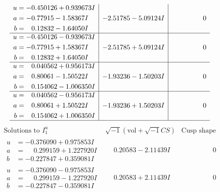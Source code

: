 \documentclass[1p]{elsarticle_modified}
\theoremstyle{definition}
\newcommand{\I}{\sqrt{-1}}
\begin{document}
$$\begin{array}{c|c|c}
\begin{aligned}
u &= -0.450126 + 0.939673 I \\
a &= -0.77915 - 1.58367 I \\
b &= \phantom{-}0.12832 - 1.64050 I\end{aligned}
 & -2.51785 - 5.09124 I & \phantom{-0.000000 } 0 \\ \hline\begin{aligned}
u &= -0.450126 - 0.939673 I \\
a &= -0.77915 + 1.58367 I \\
b &= \phantom{-}0.12832 + 1.64050 I\end{aligned}
 & -2.51785 + 5.09124 I & \phantom{-0.000000 } 0 \\ \hline\begin{aligned}
u &= \phantom{-}0.040562 + 0.956173 I \\
a &= \phantom{-}0.80061 - 1.50522 I \\
b &= \phantom{-}0.154062 - 1.006350 I\end{aligned}
 & -1.93236 - 1.50203 I & \phantom{-0.000000 } 0 \\ \hline\begin{aligned}
u &= \phantom{-}0.040562 - 0.956173 I \\
a &= \phantom{-}0.80061 + 1.50522 I \\
b &= \phantom{-}0.154062 + 1.006350 I\end{aligned}
 & -1.93236 + 1.50203 I & \phantom{-0.000000 } 0\\
 \hline 
 \end{array}$$\newpage$$\begin{array}{c|c|c}  
\text{Solutions to }I^u_{1}& \I (\text{vol} + \sqrt{-1}CS) & \text{Cusp shape}\\
 \hline 
\begin{aligned}
u &= -0.376090 + 0.975853 I \\
a &= \phantom{-}0.299159 + 1.227920 I \\
b &= -0.227847 + 0.359081 I\end{aligned}
 & \phantom{-}0.20583 - 2.11439 I & \phantom{-0.000000 } 0 \\ \hline\begin{aligned}
u &= -0.376090 - 0.975853 I \\
a &= \phantom{-}0.299159 - 1.227920 I \\
b &= -0.227847 - 0.359081 I\end{aligned}
 & \phantom{-}0.20583 + 2.11439 I & \phantom{-0.000000 } 0 \\ \hline\begin{aligned}

\end{aligned}
\end{array}$$
\end{document}
